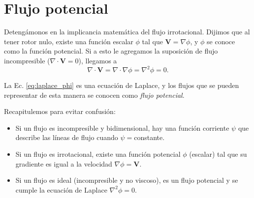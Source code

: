 \section*{Flujo potencial}
Detengámonos en la implicancia matemática del flujo irrotacional.
Dijimos que al tener rotor nulo, existe una función escalar $\phi$ tal que $\mathbf{V}=\nabla\phi$, y $\phi$ se conoce como la función potencial.
Si a esto le agregamos la suposición de flujo incompresible ($\nabla\cdot\mathbf{V}=0$), llegamos a
%
\begin{equation}\label{eq:laplace_phi}
\nabla\cdot\mathbf{V} = \nabla\cdot\nabla\phi = \nabla^2\phi=0.
\end{equation}

La Ec. \eqref{eq:laplace_phi} es una ecuación de Laplace, y los flujos que se pueden representar de esta manera se conocen como \emph{flujo potencial}.

Recapitulemos para evitar confusión:
\begin{itemize}
\item Si un flujo es incompresible y bidimensional, hay una función corriente $\psi$ que describe las líneas de flujo cuando $\psi=$constante.
\item Si un flujo es irrotacional, existe una función potencial $\phi$ (escalar) tal que su gradiente es igual a la velocidad $\nabla\phi=\mathbf{V}$.
\item Si un flujo es ideal (incompresible y no viscoso), es un flujo potencial y se cumple la ecuación de Laplace $\nabla^2\phi=0$.
\end{itemize}
